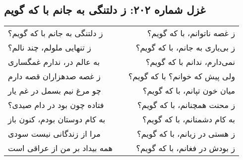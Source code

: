 \begin{center}
\section*{غزل شماره ۲۰۲: ز دلتنگی به جانم با که گویم}
\label{sec:202}
\begin{longtable}{l p{0.5cm} r}
ز دلتنگی به جانم با که گویم؟
&&
ز غصه ناتوانم، با که گویم؟
\\
ز تنهایی ملولم، چند نالم؟
&&
ز بی‌یاری به جانم، با که گویم؟
\\
به عالم در، ندارم غمگساری
&&
نمی‌دارم، ندانم با که گویم؟
\\
ز غصه صدهزاران قصه دارم
&&
ولی پیش که خوانم؟ با که گویم؟
\\
چو مرغ نیم بسمل در غم یار
&&
میان خون تپانم، با که گویم؟
\\
فتاده چون بود در دام صیدی؟
&&
ز محنت همچنانم، با که گویم؟
\\
به کام دوستان بودم، کنون باز
&&
به کام دشمنانم، با که گویم؟
\\
مرا از زندگانی نیست سودی
&&
ز هستی در زیانم، با که گویم؟
\\
همه بیداد بر من از عراقی است
&&
ز بودش در فغانم، با که گویم؟
\\
\end{longtable}
\end{center}
